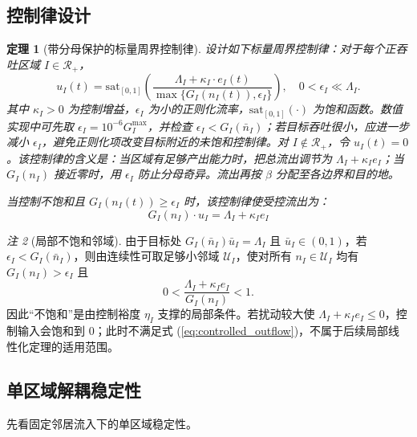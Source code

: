 \documentclass[a4paper,12pt]{article}
\theoremstyle{plain}
\newtheorem{theorem}{定理}[section]
\theoremstyle{definition}
\theoremstyle{remark}
\newtheorem{remark}[theorem]{注}
\begin{document}
\subsection{控制律设计}

\begin{theorem}[带分母保护的标量周界控制律]\label{thm:control_law}
设计如下标量周界控制律：对于每个正吞吐区域 $I \in \mathcal{R}_+$，
\begin{equation}\label{eq:control_law}
    u_I(t) = \text{sat}_{[0,1]}\left( \frac{\Lambda_I + \kappa_I \cdot e_I(t)}{\max\{G_I(n_I(t)),\epsilon_I\}} \right),
    \quad 0<\epsilon_I\ll \Lambda_I .
\end{equation}
其中 $\kappa_I > 0$ 为控制增益，$\epsilon_I$ 为小的正则化流率，$\text{sat}_{[0,1]}(\cdot)$ 为饱和函数。数值实现中可先取 $\epsilon_I=10^{-6}G_I^{\max}$，并检查 $\epsilon_I<G_I(\bar n_I)$；若目标吞吐很小，应进一步减小 $\epsilon_I$，避免正则化项改变目标附近的未饱和控制律。对 $I\notin\mathcal R_+$，令 $u_I(t)=0$。该控制律的含义是：当区域有足够产出能力时，把总流出调节为 $\Lambda_I+\kappa_I e_I$；当 $G_I(n_I)$ 接近零时，用 $\epsilon_I$ 防止分母奇异。流出再按 $\beta$ 分配至各边界和目的地。

当控制不饱和且 $G_I(n_I(t))\ge \epsilon_I$ 时，该控制律使受控流出为：
\begin{equation}\label{eq:controlled_outflow}
    G_I(n_I) \cdot u_I = \Lambda_I + \kappa_I e_I
\end{equation}
\end{theorem}

\begin{remark}[局部不饱和邻域]\label{rem:unsaturated_neighborhood}
由于目标处 $G_I(\bar n_I)\bar u_I=\Lambda_I$ 且 $\bar u_I\in(0,1)$，若 $\epsilon_I<G_I(\bar n_I)$，则由连续性可取足够小邻域 $\mathcal U_I$，使对所有 $n_I\in\mathcal U_I$ 均有 $G_I(n_I)>\epsilon_I$ 且
\begin{equation}
    0<\frac{\Lambda_I+\kappa_I e_I}{G_I(n_I)}<1 .
\end{equation}
因此“不饱和”是由控制裕度 $\eta_I$ 支撑的局部条件。若扰动较大使 $\Lambda_I+\kappa_I e_I\le0$，控制输入会饱和到 $0$；此时不满足式 (\ref{eq:controlled_outflow})，不属于后续局部线性化定理的适用范围。
\end{remark}

\subsection{单区域解耦稳定性}

先看固定邻居流入下的单区域稳定性。
\end{document}

